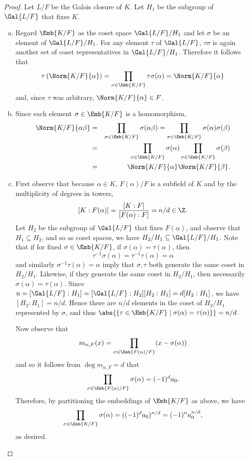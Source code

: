 \documentclass[10pt]{amsart}
\begin{document}
\begin{thm}
  \begin{proof}
    Let $L/F$ be the Galois closure of $K$.
    Let $H_1$ be the subgroup of $\Gal{L/F}$ that fixes $K$.
    \begin{enumerate}[(a)]
    \item
      Regard $\Emb{K/F}$ as the coset space $\Gal{L/F}/H_1$ and let $\sigma$ be an element of $\Gal{L/F}/H_1$.
      For any element $\tau$ of $\Gal{L/F}$, $\tau\sigma$ is again another set of coset representatives in $\Gal{L/F}/H_1$.
      Therefore it follows that
      $$\tau\left(\Norm{K/F}{\alpha}\right) = \prod_{\sigma \in \Emb{K/F}} \tau\sigma(\alpha) = \Norm{K/F}{\alpha}$$
      and, since $\tau$ was arbitrary, $\Norm{K/F}{\alpha} \in F$.
    \item
      Since each element $\sigma \in \Emb{K/F}$ is a homomorphism,
      \begin{eqnarray*}
        \Norm{K/F}{\alpha\beta} &=& \prod_{\sigma \in \Emb{K/F}} \sigma(\alpha\beta) = \prod_{\sigma \in \Emb{K/F}} \sigma(\alpha)\sigma(\beta)\\
        &=& \prod_{\sigma \in \Emb{K/F}}\sigma(\alpha)\prod_{\sigma \in \Emb{K/F}}\sigma(\beta)\\
        &=& \Norm{K/F}{\alpha}\Norm{K/F}{\beta}.
      \end{eqnarray*}
    \item
      First observe that because $\alpha \in K$, $F(\alpha)/F$ is a subfield of $K$ and by the multiplicity of degrees in towers, 
      $$[K : F(\alpha)] = \frac{[K : F]}{[F(\alpha) : F]} = n/d \in \Z.$$
      Let $H_2$ be the subgroup of $\Gal{L/F}$ that fixes $F(\alpha)$, and observe that $H_1 \subseteq H_2$, and so as coset spaces, we have $H_2/H_1 \subseteq \Gal{L/F} / H_1$.
      Note that if for fixed $\sigma \in \Emb{K/F}$, if $\sigma(\alpha) = \tau(\alpha)$, then 
      $$\tau^{-1}\sigma(\alpha) = \tau^{-1}\tau(\alpha) = \alpha$$
      and similarly $\sigma^{-1}\tau(\alpha) = \alpha$ imply that $\sigma, \tau$ both generate the same coset in $H_2/H_1$.
      Likewise, if they generate the same coset in $H_2/H_1$, then necessarily $\sigma(\alpha) = \tau(\alpha)$.
      Since $n = [\Gal{L/F} : H_1] = [\Gal{L/F} : H_2][H_2 : H_1] = d[H_2 : H_1]$, we have $[H_2 : H_1] = n/d$.
      Hence there are $n/d$ elements in the coset of $H_2/H_1$ represented by $\sigma$, and thus $\abs{\left\{\tau \in \Emb{K/F} \;\middle\vert\; \sigma(\alpha) = \tau(\alpha)\right\}} = n/d.$
      
      Now observe that 
      $$m_{\alpha, F}(x) = \prod_{\sigma \in \Emb{F(\alpha)/F}} (x - \sigma(\alpha))$$
      and so it follows from $\deg{m_{\alpha,F}} = d$ that
      $$\prod_{\sigma \in \Emb{F(\alpha)/F}} \sigma(\alpha) = (-1)^d a_0.$$
      Therefore, by partitioning the embeddings of $\Emb{K/F}$ as above, we have
      $$\prod_{\sigma \in \Emb{K/F}} \sigma(\alpha) = ((-1)^d a_0)^{n/d} = (-1)^n a_0^{n/d},$$
      as desired.
    \end{enumerate}
  \end{proof}
\end{thm}
\end{document}
